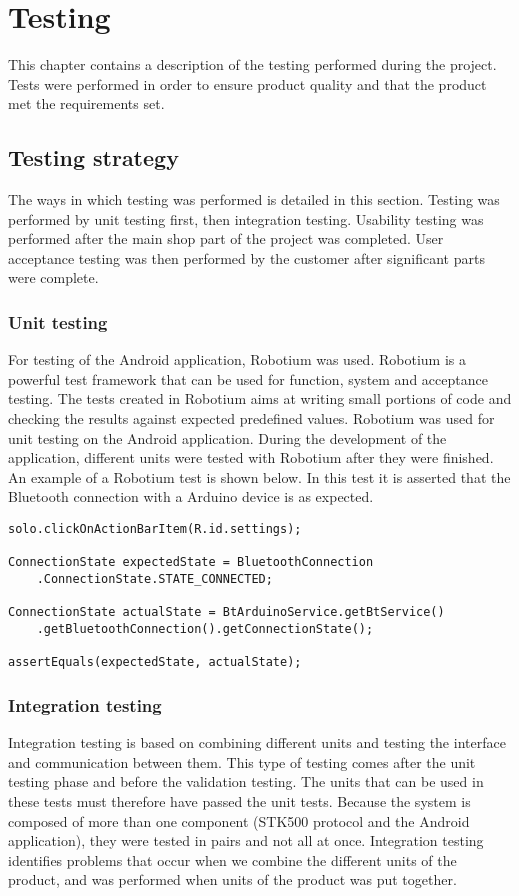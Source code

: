 \chapter{Testing}
	This chapter contains a description of the testing performed during the project. Tests were performed in order to ensure product quality and that the product met the requirements set.
	
	\section{Testing strategy}
		The ways in which testing was performed is detailed in this section. Testing was performed by unit testing first, then integration testing. Usability testing was performed after the main shop part of the project was completed. User acceptance testing was then performed by the customer after significant parts were complete.

		\subsection{Unit testing}
			For testing of the Android application, Robotium was used. Robotium is a powerful test framework that can be used for function, system and acceptance testing. The tests created in Robotium aims at writing small portions of code and checking the results against expected predefined values. Robotium was used for unit testing on the Android application. During the development of the application, different units were tested with Robotium after they were finished. An example of a Robotium test is shown below. In this test it is asserted that the Bluetooth connection with a Arduino device is as expected. \\

			\begin{lstlisting}
solo.clickOnActionBarItem(R.id.settings);

ConnectionState expectedState = BluetoothConnection
	.ConnectionState.STATE_CONNECTED;
	
ConnectionState actualState = BtArduinoService.getBtService()
	.getBluetoothConnection().getConnectionState();

assertEquals(expectedState, actualState);
			\end{lstlisting}

		\subsection{Integration testing}
		Integration testing is based on combining different units and testing the interface and communication between them. This type of testing comes after the unit testing phase and before the validation testing. The units that can be used in these tests must therefore have passed the unit tests. Because the system is composed of more than one component (STK500 protocol and the Android application), they were tested in pairs and not all at once. Integration testing identifies problems that occur when we combine the different units of the product, and was performed when units of the product was put together.

